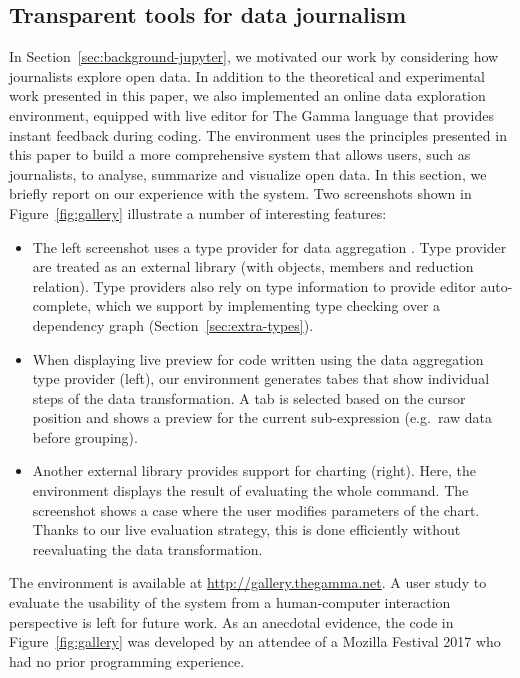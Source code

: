 \documentclass[english,submission]{programming}
\theoremstyle{plain}
\theoremstyle{definition}
\begin{document}

\subsection{Transparent tools for data journalism}
\label{sec:evaluation-case}

In Section~\ref{sec:background-jupyter}, we motivated our work by considering how journalists
explore open data. In addition to the theoretical and experimental work presented in this paper,
we also implemented an online data exploration environment, equipped with live editor for The
Gamma language that provides instant feedback during coding. The environment uses the
principles presented in this paper to build a more comprehensive system that allows users,
such as journalists, to analyse, summarize and visualize open data. In this section, we briefly
report on our experience with the system. Two screenshots shown
in Figure~\ref{fig:gallery} illustrate a number of interesting features:

\begin{itemize}
\item The left screenshot uses a type provider for data aggregation \cite{gamma}.
  Type provider are treated as an external library
  (with objects, members and reduction relation). Type providers also rely on type information to
  provide editor auto-complete, which we support by implementing type checking over a
  dependency graph (Section~\ref{sec:extra-types}).

\item When displaying live preview for code written using the data aggregation type provider (left),
  our environment generates tabes that show individual steps of the data transformation.
  A tab is selected based on the cursor position and shows a preview for the current sub-expression
  (e.g.~raw data before grouping).

\item Another external library provides support for charting (right). Here, the environment
  displays the result of evaluating the whole command. The screenshot shows a case where the user
  modifies parameters of the chart. Thanks to our live evaluation
  strategy, this is done efficiently without reevaluating the data transformation.
\end{itemize}

\noindent
The environment is available at \url{http://gallery.thegamma.net}.
A user study to evaluate the usability of the system from a human-computer interaction perspective
is left for future work. As an anecdotal evidence, the code in
Figure~\ref{fig:gallery} was developed by an attendee of a Mozilla Festival 2017
who had no prior programming experience.
\end{document}
